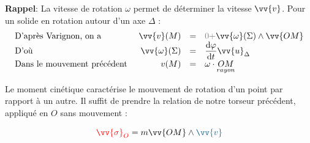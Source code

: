\documentclass[11pt,a4paper,fleqn,pdftex]{report}
\begin{document}
\textbf{Rappel}: La vitesse de rotation $\omega$ permet de déterminer la vitesse $\vv{v}$. Pour un solide en rotation autour d'un axe $\Delta$ : 
$$
\begin{array}{l r c l}
\text{D'après Varignon, on a }&\vv{v}(M)&=& \textcolor{gray}{0}\textcolor{gray}{+}\vv{\omega}(\Sigma)\wedge\vv{OM}\\
\text{D'où }&\vv{\omega}(\Sigma)&=&\der{\varphi}{t}\vv{u}_\Delta\\
\text{Dans le mouvement précédent }&v(M)&=&\omega\cdot\underset{rayon}{OM}
\end{array}
$$
\begin{dfn}
Le moment cinétique caractérise le mouvement de rotation d'un point par rapport à un autre. Il suffit de prendre la relation de notre torseur précédent, appliqué en $O$ sans mouvement :\\
\begin{minipage}{5cm}%
\begin{equation}\label{Moment Cinetique}
\textcolor{couleurImp}{\vv{\sigma}_O}=m\vv{OM}\wedge\textcolor{MidnightBlue}{\vv{v}}
\end{equation}
\end{minipage}
\begin{minipage}{5cm}%
\end{minipage}
\end{dfn}
%
\end{document}
